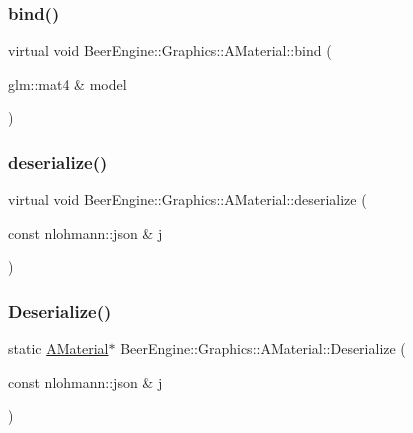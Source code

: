 \subsubsection{\texorpdfstring{bind()}{bind()}}
{\footnotesize\ttfamily virtual void Beer\+Engine\+::\+Graphics\+::\+A\+Material\+::bind (\begin{DoxyParamCaption}\item[{glm\+::mat4 \&}]{model }\end{DoxyParamCaption})\hspace{0.3cm}{\ttfamily [virtual]}}

\mbox{\label{class_beer_engine_1_1_graphics_1_1_a_material_afa6ac6e48d4433d62777d5fe9984faaa}} 
\subsubsection{\texorpdfstring{deserialize()}{deserialize()}}
{\footnotesize\ttfamily virtual void Beer\+Engine\+::\+Graphics\+::\+A\+Material\+::deserialize (\begin{DoxyParamCaption}\item[{const nlohmann\+::json \&}]{j }\end{DoxyParamCaption})\hspace{0.3cm}{\ttfamily [virtual]}}

\mbox{\label{class_beer_engine_1_1_graphics_1_1_a_material_af7b1dba516520bff75c3e71756959916}} 
\subsubsection{\texorpdfstring{Deserialize()}{Deserialize()}}
{\footnotesize\ttfamily static \mbox{\hyperlink{class_beer_engine_1_1_graphics_1_1_a_material}{A\+Material}}$\ast$ Beer\+Engine\+::\+Graphics\+::\+A\+Material\+::\+Deserialize (\begin{DoxyParamCaption}\item[{const nlohmann\+::json \&}]{j }\end{DoxyParamCaption})\hspace{0.3cm}{\ttfamily [static]}}

